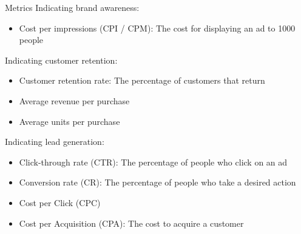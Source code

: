\begin{definition}
    {Metrics}
    Indicating brand awareness:
    \begin{itemize}
        \item Cost per impressions (CPI / CPM): The cost for displaying an ad to 1000 people
    \end{itemize}
    Indicating customer retention:
    \begin{itemize}
        \item Customer retention rate: The percentage of customers that return
        \item Average revenue per purchase
        \item Average units per purchase
    \end{itemize}
    Indicating lead generation:
    \begin{itemize}
        \item Click-through rate (CTR): The percentage of people who click on an ad
        \item Conversion rate (CR): The percentage of people who take a desired action
        \item Cost per Click (CPC)
        \item Cost per Acquisition (CPA): The cost to acquire a customer
    \end{itemize}
\end{definition}
